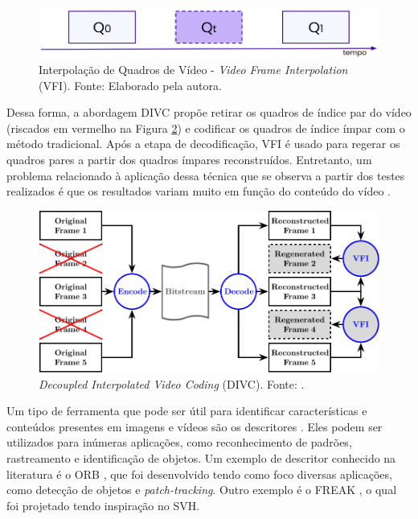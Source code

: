 \begin{figure}[htb]
    \centering
    \includegraphics[width=0.8\columnwidth,keepaspectratio]{images/vfi1.png}
    \caption{Interpolação de Quadros de Vídeo - \textit{Video Frame Interpolation} (VFI). Fonte: Elaborado pela autora.}
    \label{fig:vfi}
\end{figure}

Dessa forma, a abordagem \ac{DIVC} propõe retirar os quadros de índice par do vídeo (riscados em vermelho na Figura \ref{fig:divc}) e codificar os quadros de índice ímpar com o método tradicional. Após a etapa de decodificação, \ac{VFI} é usado para regerar os quadros pares a partir dos quadros ímpares reconstruídos. Entretanto, um problema relacionado à aplicação dessa técnica que se observa a partir dos testes realizados é que os resultados variam muito em função do conteúdo do vídeo \cite{ours}.

\begin{figure}[htb]
    \centering
    \includegraphics[width=0.8\columnwidth,keepaspectratio]{images/hybrid_vfi.pdf}
    \caption{\textit{Decoupled Interpolated Video Coding} (DIVC). Fonte: \textcite{ours}.}
    \label{fig:divc}
\end{figure}

Um tipo de ferramenta que pode ser útil para identificar características e conteúdos presentes em imagens e vídeos são os descritores \cite{Kumar2014ASO}. Eles podem ser utilizados para inúmeras aplicações, como reconhecimento de padrões, rastreamento e identificação de objetos. Um exemplo de descritor conhecido na literatura é o \ac{ORB} \cite{orb}, que foi desenvolvido tendo como foco diversas aplicações, como detecção de objetos e \textit{patch-tracking}. Outro exemplo é o \ac{FREAK} \cite{freak}, o qual foi projetado tendo inspiração no \ac{SVH}.

